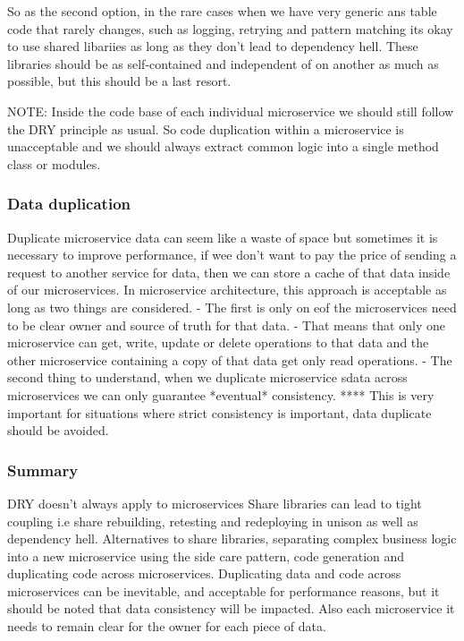 \documentclass[a4paper, 11pt]{book}
\begin{document}
    So as the second option, in the rare cases when we have very generic ans table code that rarely changes, such as logging, retrying and pattern matching its okay to use shared libariies as long as they don't lead to dependency hell.
    These libraries should be as self-contained and independent of on another as much as possible, but this should be a last resort.

    NOTE: Inside the code base of each individual microservice we should still follow the DRY principle as usual.
    So code duplication within a microservice is unacceptable and we should always extract common logic into a single method class or modules.

    \subsubsection{Data duplication}
    Duplicate microservice data can seem like a waste of space but sometimes it is necessary to improve performance, if wee don't want to pay the price of sending a request to another service for data, then we can store a cache of that data inside of our microservices.
    In microservice architecture, this approach is acceptable as long as two things are considered.
    - The first is only on eof the microservices need to be clear owner and source of truth for that data.
    - That means that only one microservice can get, write, update or delete operations to that data and the other microservice containing a copy of that data get only read operations.
    - The second thing to understand, when we duplicate microservice sdata across microservices we can only guarantee *eventual* consistency.
    **** This is very important for situations where strict consistency is important, data duplicate should be avoided.

    \subsubsection{Summary}
    DRY doesn't always apply to microservices
    Share libraries can lead to tight coupling i.e share rebuilding, retesting and redeploying in unison as well as dependency hell.
    Alternatives to share libraries, separating complex business logic into a new microservice using the side care pattern, code generation and duplicating code across microservices.
    Duplicating data and code across microservices can be inevitable, and acceptable for performance reasons, but it should be noted that data consistency will be impacted.
    Also each microservice it needs to remain clear for the owner for each piece of data.
\end{document}
